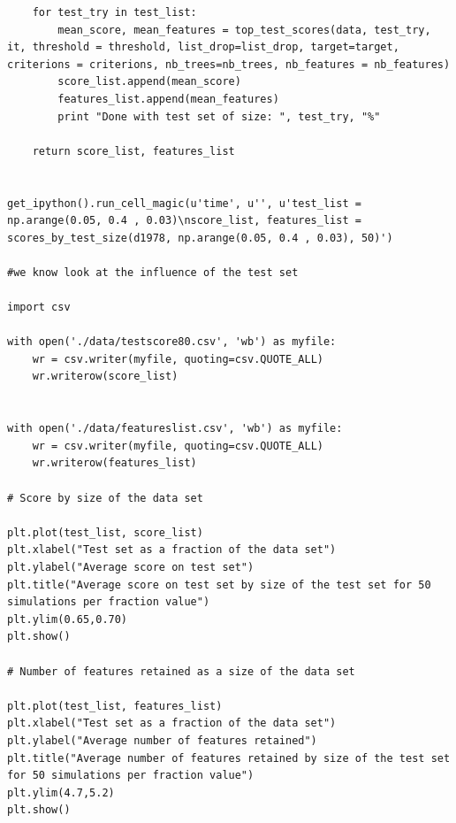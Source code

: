 \documentclass[a4paper]{article}
\theoremstyle{plain}
\begin{document}
\begin{lstlisting}
    for test_try in test_list:
        mean_score, mean_features = top_test_scores(data, test_try, it, threshold = threshold, list_drop=list_drop, target=target, criterions = criterions, nb_trees=nb_trees, nb_features = nb_features)
        score_list.append(mean_score)
        features_list.append(mean_features)
        print "Done with test set of size: ", test_try, "%"
    
    return score_list, features_list


get_ipython().run_cell_magic(u'time', u'', u'test_list = np.arange(0.05, 0.4 , 0.03)\nscore_list, features_list = scores_by_test_size(d1978, np.arange(0.05, 0.4 , 0.03), 50)')

#we know look at the influence of the test set

import csv

with open('./data/testscore80.csv', 'wb') as myfile:
    wr = csv.writer(myfile, quoting=csv.QUOTE_ALL)
    wr.writerow(score_list)
    
    
with open('./data/featureslist.csv', 'wb') as myfile:
    wr = csv.writer(myfile, quoting=csv.QUOTE_ALL)
    wr.writerow(features_list)

# Score by size of the data set

plt.plot(test_list, score_list)
plt.xlabel("Test set as a fraction of the data set")
plt.ylabel("Average score on test set")
plt.title("Average score on test set by size of the test set for 50 simulations per fraction value")
plt.ylim(0.65,0.70)
plt.show()

# Number of features retained as a size of the data set

plt.plot(test_list, features_list)
plt.xlabel("Test set as a fraction of the data set")
plt.ylabel("Average number of features retained")
plt.title("Average number of features retained by size of the test set for 50 simulations per fraction value")
plt.ylim(4.7,5.2)
plt.show()

\end{lstlisting}
\end{document}
